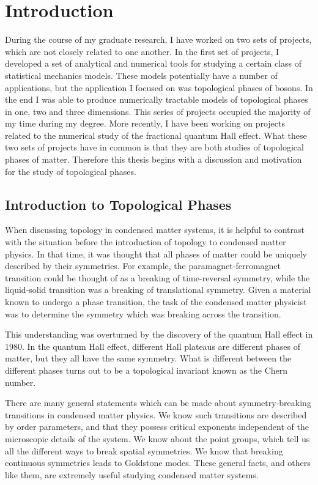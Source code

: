 \chapter{Introduction}

During the course of my graduate research, I have worked on two sets of projects, which are not closely related to one another. In the first set of projects, I developed a set of analytical and numerical tools for studying a certain class of statistical mechanics models. These models potentially have a number of applications, but the application I focused on was topological phases of bosons. In the end I was able to produce numerically tractable models of topological phases in one, two and three dimensions. This series of projects occupied the majority of my time during my degree. 
More recently, I have been working on projects related to the numerical study of the fractional quantum Hall effect. What these two sets of projects have in common is that they are both studies of topological phases of matter. Therefore this thesis begins with a discussion and motivation for the study of topological phases.

\section{Introduction to Topological Phases}

When discussing topology in condensed matter systems, it is helpful to contrast with the situation before the introduction of topology to condensed matter physics. In that time, it was thought that all phases of matter could be uniquely described by their symmetries. For example, the paramagnet-ferromagnet transition could be thought of as a breaking of time-reversal symmetry, while the liquid-solid transition was a breaking of translational symmetry. Given a material known to undergo a phase transition, the task of the condensed matter physicist was to determine the symmetry which was breaking across the transition.

This understanding was overturned by the discovery of the quantum Hall effect in 1980.\cite{klitzing} In the quantum Hall effect, different Hall plateaus are different phases of matter, but they all have the same symmetry. What is different between the different phases turns out to be a topological invariant known as the Chern number. 

There are many general statements which can be made about symmetry-breaking transitions in condensed matter physics. We know such transitions are described by order parameters, and that they possess critical exponents independent of the microscopic details of the system. We know about the point groups, which tell us all the different ways to break spatial symmetries. We know that breaking continuous symmetries leads to Goldstone modes. These general facts, and others like them, are extremely useful studying condensed matter systems. 

